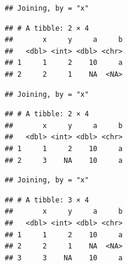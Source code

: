 \documentclass[]{book}
\newenvironment{Shaded}{\begin{snugshade}}{\end{snugshade}}
\newcommand{\KeywordTok}[1]{\textcolor[rgb]{0.13,0.29,0.53}{\textbf{{#1}}}}
\newcommand{\DataTypeTok}[1]{\textcolor[rgb]{0.13,0.29,0.53}{{#1}}}
\newcommand{\StringTok}[1]{\textcolor[rgb]{0.31,0.60,0.02}{{#1}}}
\newcommand{\CommentTok}[1]{\textcolor[rgb]{0.56,0.35,0.01}{\textit{{#1}}}}
\newcommand{\NormalTok}[1]{{#1}}
\theoremstyle{definition}
\theoremstyle{definition}
\theoremstyle{remark}
\begin{document}
\begin{verbatim}
## Joining, by = "x"
\end{verbatim}

\begin{verbatim}
## # A tibble: 2 × 4
##       x     y     a     b
##   <dbl> <int> <dbl> <chr>
## 1     1     2    10     a
## 2     2     1    NA  <NA>
\end{verbatim}

\begin{Shaded}
\end{Shaded}

\begin{verbatim}
## Joining, by = "x"
\end{verbatim}

\begin{verbatim}
## # A tibble: 2 × 4
##       x     y     a     b
##   <dbl> <int> <dbl> <chr>
## 1     1     2    10     a
## 2     3    NA    10     a
\end{verbatim}

\begin{Shaded}
\end{Shaded}

\begin{verbatim}
## Joining, by = "x"
\end{verbatim}

\begin{verbatim}
## # A tibble: 3 × 4
##       x     y     a     b
##   <dbl> <int> <dbl> <chr>
## 1     1     2    10     a
## 2     2     1    NA  <NA>
## 3     3    NA    10     a
\end{verbatim}

\begin{Shaded}
\end{Shaded}
\end{document}

